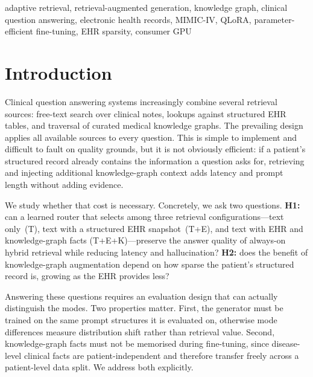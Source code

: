 \documentclass[conference]{IEEEtran}
\begin{document}
\begin{IEEEkeywords}
adaptive retrieval, retrieval-augmented generation, knowledge graph,
clinical question answering, electronic health records, MIMIC-IV,
QLoRA, parameter-efficient fine-tuning, EHR sparsity, consumer GPU
\end{IEEEkeywords}

\section{Introduction}

Clinical question answering systems increasingly combine several
retrieval sources: free-text search over clinical notes, lookups
against structured EHR tables, and traversal of curated medical
knowledge graphs. The prevailing design applies all available sources
to every question. This is simple to implement and difficult to fault
on quality grounds, but it is not obviously efficient: if a patient's
structured record already contains the information a question asks
for, retrieving and injecting additional knowledge-graph context adds
latency and prompt length without adding evidence.

We study whether that cost is necessary. Concretely, we ask two
questions. \textbf{H1:} can a learned router that selects among three
retrieval configurations---text only~(T), text with a structured EHR
snapshot~(T+E), and text with EHR and knowledge-graph facts
(T+E+K)---preserve the answer quality of always-on hybrid retrieval
while reducing latency and hallucination? \textbf{H2:} does the
benefit of knowledge-graph augmentation depend on how sparse the
patient's structured record is, growing as the EHR provides less?

Answering these questions requires an evaluation design that can
actually distinguish the modes. Two properties matter. First, the
generator must be trained on the same prompt structures it is
evaluated on, otherwise mode differences measure distribution shift
rather than retrieval value. Second, knowledge-graph facts must not
be memorised during fine-tuning, since disease-level clinical facts
are patient-independent and therefore transfer freely across a
patient-level data split. We address both explicitly.
\end{document}
